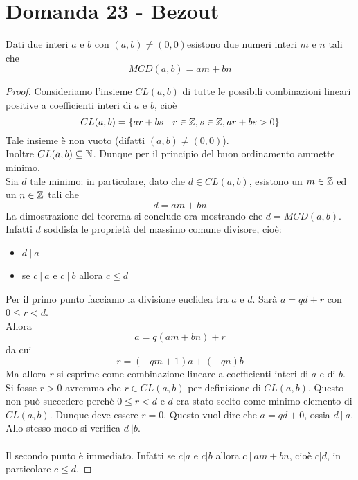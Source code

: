 \documentclass[]{article}
\begin{document}
\section{Domanda 23 - Bezout}\label{x1}
\begin{lem}[di Bezout]
Dati due interi $a$ e $b$ con $(a,b) \not= (0,0)$esistono due numeri interi $m$ e $n$ tali che $$MCD(a,b) = am+bn$$
\end{lem}
\begin{proof}
Consideriamo l'insieme $CL(a,b)$ di tutte le possibili combinazioni lineari positive a coefficienti interi di $a$ e $b$, cioè $$CL(a,b) = \{ ar+bs\ |\ r \in \mathbb{Z}, s \in \mathbb{Z}, ar+bs > 0\}$$
Tale insieme è non vuoto (difatti $(a,b) \not= (0,0)$).\\ Inoltre $CL(a,b) \subseteq \mathbb{N}$. Dunque per il principio del buon ordinamento ammette minimo.\\
Sia $d$ tale minimo: in particolare, dato che $d \in CL(a,b)$, esistono un $m \in \mathbb{Z}$ ed un $n \in \mathbb{Z}$ tali che $$d = am+bn$$ La dimostrazione del teorema si conclude ora mostrando che $d = MCD(a,b)$. Infatti $d$ soddisfa le proprietà del massimo comune divisore, cioè:
\begin{itemize}
\item $d\ |\ a$
\item se $c\ |\ a$ e $c\ |\ b$ allora $c\leq d$
\end{itemize}
Per il primo punto facciamo la divisione euclidea tra $a$ e $d$. Sarà $a=qd+r$ con $0\le r < d$. \\ Allora $$a=q(am+bn)+r$$ da cui $$r=(-qm+1)a+(-qn)b$$Ma allora $r$ si esprime come combinazione lineare a coefficienti interi di $a$ e di $b$. Si fosse $r>0$ avremmo che $r \in CL(a,b)$ per definizione di $CL(a,b)$. Questo non può succedere perchè $0 \le r < d$ e $d$ era stato scelto come minimo elemento di $CL(a,b)$.
Dunque deve essere $r=0$. Questo vuol dire che $a=qd+0$, ossia $d\ |\ a$. Allo stesso modo si verifica $d\ | b$. \\ \\Il secondo punto è immediato. Infatti se $c|a$ e $c|b$ allora $c\ |\ am+bn$, cioè $c|d$, in particolare $c\le d$.
\end{proof}
\end{document}
